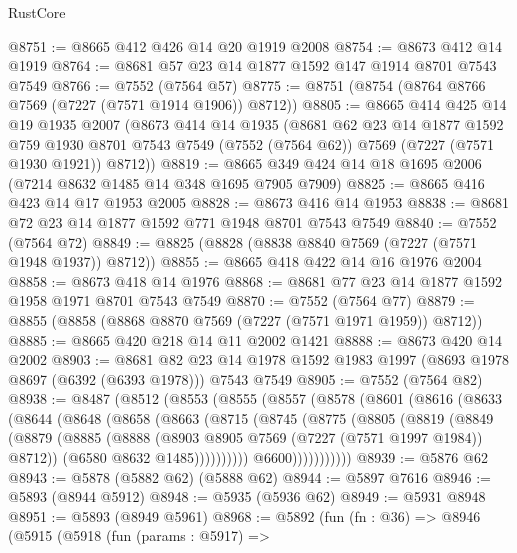 \begin{lexlean}{RustCore}
\begin{coremodule}
@8751 := @8665 @412 @426 @14 @20 @1919 @2008
@8754 := @8673 @412 @14 @1919
@8764 := @8681 @57 @23 @14 @1877 @1592 @147 @1914 @8701 @7543 @7549
@8766 := @7552 (@7564 @57)
@8775 := @8751 (@8754 (@8764 @8766 @7569 (@7227 (@7571 @1914 @1906)) @8712))
@8805 := @8665
    @414
    @425
    @14
    @19
    @1935
    @2007
    (@8673
      @414
      @14
      @1935
      (@8681
        @62
        @23
        @14
        @1877
        @1592
        @759
        @1930
        @8701
        @7543
        @7549
        (@7552 (@7564 @62))
        @7569
        (@7227 (@7571 @1930 @1921))
        @8712))
@8819 := @8665 @349 @424 @14 @18 @1695 @2006 (@7214 @8632 @1485 @14 @348 @1695 @7905 @7909)
@8825 := @8665 @416 @423 @14 @17 @1953 @2005
@8828 := @8673 @416 @14 @1953
@8838 := @8681 @72 @23 @14 @1877 @1592 @771 @1948 @8701 @7543 @7549
@8840 := @7552 (@7564 @72)
@8849 := @8825 (@8828 (@8838 @8840 @7569 (@7227 (@7571 @1948 @1937)) @8712))
@8855 := @8665 @418 @422 @14 @16 @1976 @2004
@8858 := @8673 @418 @14 @1976
@8868 := @8681 @77 @23 @14 @1877 @1592 @1958 @1971 @8701 @7543 @7549
@8870 := @7552 (@7564 @77)
@8879 := @8855 (@8858 (@8868 @8870 @7569 (@7227 (@7571 @1971 @1959)) @8712))
@8885 := @8665 @420 @218 @14 @11 @2002 @1421
@8888 := @8673 @420 @14 @2002
@8903 := @8681
    @82
    @23
    @14
    @1978
    @1592
    @1983
    @1997
    (@8693 @1978 @8697 (@6392 (@6393 @1978)))
    @7543
    @7549
@8905 := @7552 (@7564 @82)
@8938 := @8487
    (@8512
      (@8553
        (@8555
          (@8557
            (@8578
              (@8601
                (@8616
                  (@8633
                    (@8644
                      (@8648
                        (@8658
                          (@8663
                            (@8715
                              (@8745
                                (@8775
                                  (@8805
                                    (@8819
                                      (@8849
                                        (@8879
                                          (@8885
                                            (@8888
                                              (@8903 @8905 @7569 (@7227 (@7571 @1997 @1984)) @8712))
                                            (@6580 @8632 @1485))))))))))
                          @6600)))))))))))
@8939 := @5876 @62
@8943 := @5878 (@5882 @62) (@5888 @62)
@8944 := @5897 @7616
@8946 := @5893 (@8944 @5912)
@8948 := @5935 (@5936 @62)
@8949 := @5931 @8948
@8951 := @5893 (@8949 @5961)
@8968 := @5892
    (fun (fn : @36) =>
    @8946
      (@5915
        (@5918
          (fun (params : @5917) =>

\end{coremodule}
\end{lexlean}
